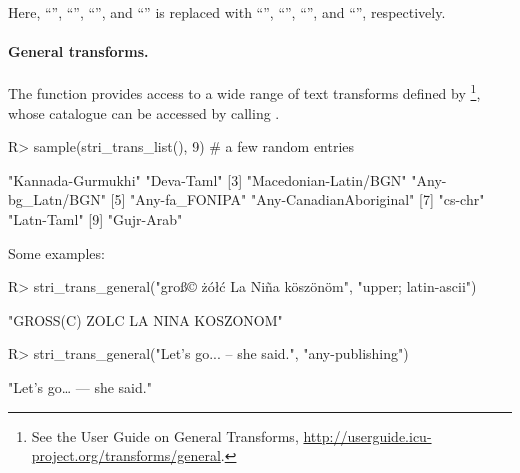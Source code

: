 \documentclass[nojss]{jss}\usepackage[]{graphicx}\usepackage[]{color}
\begin{document}
Here, ``'', ``'', ``'', and ``''
is replaced with
``'', ``'', ``'', and ``'', respectively.



\paragraph{General transforms.}
The  function
provides access to a wide range of text transforms
defined by \footnote{
See the  User Guide on {General Transforms},
\url{http://userguide.icu-project.org/transforms/general}.
}, whose catalogue can be accessed by calling
.

\begin{Schunk}
\begin{Sinput}
R> sample(stri_trans_list(), 9)  # a few random entries
\end{Sinput}
\begin{Soutput}
[1] "Kannada-Gurmukhi"       "Deva-Taml"
[3] "Macedonian-Latin/BGN"   "Any-bg_Latn/BGN"
[5] "Any-fa_FONIPA"          "Any-CanadianAboriginal"
[7] "cs-chr"                 "Latn-Taml"
[9] "Gujr-Arab"
\end{Soutput}
\end{Schunk}

Some examples:


\begin{Schunk}
\begin{Sinput}
R> stri_trans_general("groß© żółć La Niña köszönöm", "upper; latin-ascii")
\end{Sinput}
\begin{Soutput}
[1] "GROSS(C) ZOLC LA NINA KOSZONOM"
\end{Soutput}
\begin{Sinput}
R> stri_trans_general("Let's go... -- she said.", "any-publishing")
\end{Sinput}
\begin{Soutput}
[1] "Let’s go… — she said."
\end{Soutput}
\end{Schunk}





%
\end{document}
